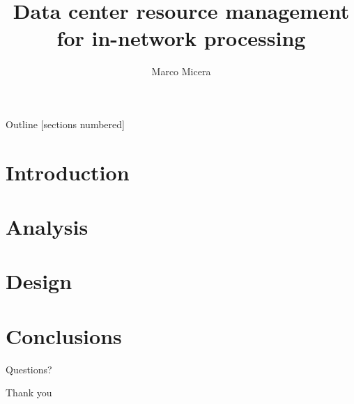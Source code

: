 

\title{Data center resource management for in-network processing}
\date{} %
\author{Marco Micera}



\maketitle

\begin{frame}{Outline}
  [sections numbered]
  \tableofcontents[hideallsubsections]
\end{frame}

\section{Introduction}


\section{Analysis}



\section{Design}


\section{Conclusions}


\begin{frame}[standout]
  Questions?
\end{frame}

\begin{frame}[standout]
  Thank you
\end{frame}

\appendix


